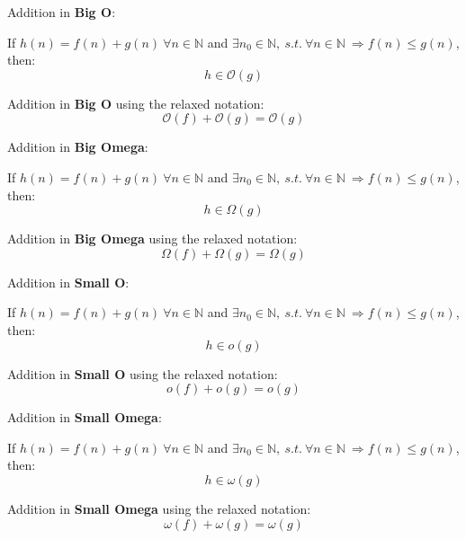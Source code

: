 \begin{lemma}
    Addition in \textbf{Big O}:

    If  $ h(n) = f(n) + g(n)\  \forall n \in  \mathbb{N} $ and $\exists n_{0} \in \mathbb{N},\ s.t.\ \forall n \in \mathbb{N} \ \Rightarrow f(n) \leq g(n)$, then:
    \[  h \in \mathcal{O}(g)\]

\end{lemma}
\begin{corollary}
    Addition in \textbf{Big O} using the relaxed notation:
    \[  \mathcal{O}(f) + \mathcal{O}(g) = \mathcal{O}(g)\]
\end{corollary}

\begin{lemma}
    Addition in \textbf{Big Omega}:

    If  $ h(n) = f(n) + g(n)\  \forall n \in  \mathbb{N} $ and $\exists n_{0} \in \mathbb{N},\ s.t.\ \forall n \in \mathbb{N} \ \Rightarrow f(n) \leq g(n)$, then:
    \[  h \in \Omega(g)\]

\end{lemma}
\begin{corollary}
    Addition in \textbf{Big Omega} using the relaxed notation:
    \[  \Omega(f) + \Omega(g) = \Omega(g)\]
\end{corollary}

\begin{lemma}
    Addition in \textbf{Small O}:

    If  $ h(n) = f(n) + g(n)\  \forall n \in  \mathbb{N} $ and $\exists n_{0} \in \mathbb{N},\ s.t.\ \forall n \in \mathbb{N} \ \Rightarrow f(n) \leq g(n)$, then:
    \[  h \in o(g)\]

\end{lemma}
\begin{corollary}
    Addition in \textbf{Small O} using the relaxed notation:
    \[  o(f) + o(g) = o(g)\]
\end{corollary}

\begin{lemma}
    Addition in \textbf{Small Omega}:

    If  $ h(n) = f(n) + g(n)\  \forall n \in  \mathbb{N} $ and $\exists n_{0} \in \mathbb{N},\ s.t.\ \forall n \in \mathbb{N} \ \Rightarrow f(n) \leq g(n)$, then:
    \[  h \in \omega(g)\]

\end{lemma}
\begin{corollary}
    Addition in \textbf{Small Omega} using the relaxed notation:
    \[  \omega(f) + \omega(g) = \omega(g)\]
\end{corollary}
